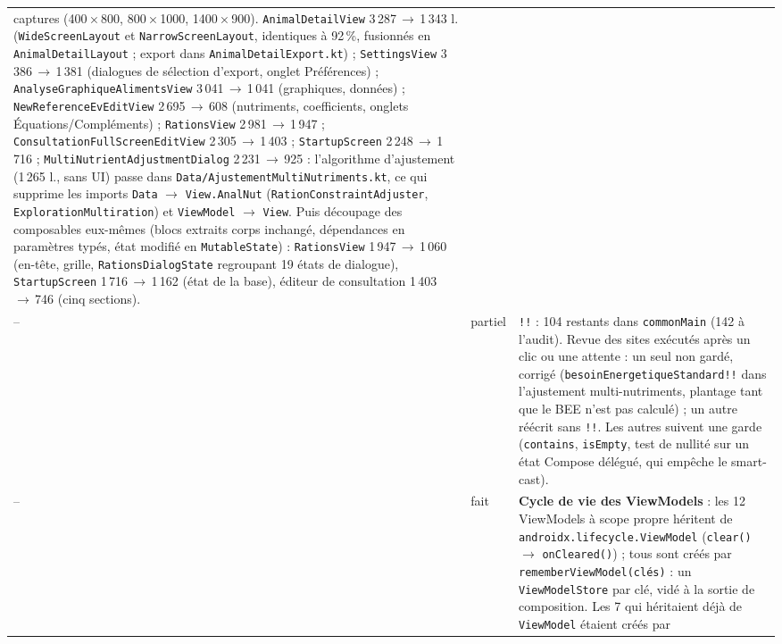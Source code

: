 \documentclass[11pt,a4paper]{article}
\newcommand{\code}[1]{\texttt{#1}}
\begin{document}
\begin{longtable}{p{0.5cm}p{3.2cm}p{11cm}}
           captures (400\,×\,800, 800\,×\,1000, 1400\,×\,900).
           \code{AnimalDetailView} 3\,287\,$\to$\,1\,343 l. (\code{WideScreenLayout} et
           \code{NarrowScreenLayout}, identiques à 92\,\%, fusionnés en \code{AnimalDetailLayout} ;
           export dans \code{AnimalDetailExport.kt}) ;
           \code{SettingsView} 3\,386\,$\to$\,1\,381 (dialogues de sélection d'export, onglet Préférences) ;
           \code{AnalyseGraphiqueAlimentsView} 3\,041\,$\to$\,1\,041 (graphiques, données) ;
           \code{NewReferenceEvEditView} 2\,695\,$\to$\,608 (nutriments, coefficients, onglets
           Équations/Compléments) ; \code{RationsView} 2\,981\,$\to$\,1\,947 ;
           \code{ConsultationFullScreenEditView} 2\,305\,$\to$\,1\,403 ;
           \code{StartupScreen} 2\,248\,$\to$\,1\,716 ;
           \code{MultiNutrientAdjustmentDialog} 2\,231\,$\to$\,925 : l'algorithme d'ajustement
           (1\,265 l., sans UI) passe dans \code{Data/AjustementMultiNutriments.kt}, ce qui supprime
           les imports \code{Data} $\to$ \code{View.AnalNut} (\code{RationConstraintAdjuster},
           \code{ExplorationMultiration}) et \code{ViewModel} $\to$ \code{View}.
           Puis découpage des composables eux-mêmes (blocs extraits corps inchangé, dépendances en
           paramètres typés, état modifié en \code{MutableState}) : \code{RationsView}
           1\,947\,$\to$\,1\,060 (en-tête, grille, \code{RationsDialogState} regroupant 19 états de
           dialogue), \code{StartupScreen} 1\,716\,$\to$\,1\,162 (état de la base),
           éditeur de consultation 1\,403\,$\to$\,746 (cinq sections). \\
-- & partiel & \code{!!} : 104 restants dans \code{commonMain} (142 à l'audit). Revue des sites
           exécutés après un clic ou une attente : un seul non gardé, corrigé
           (\code{besoinEnergetiqueStandard!!} dans l'ajustement multi-nutriments, plantage tant que le BEE
           n'est pas calculé) ; un autre réécrit sans \code{!!}. Les autres suivent une garde
           (\code{contains}, \code{isEmpty}, test de nullité sur un état Compose délégué, qui empêche le
           smart-cast). \\
-- & fait & \textbf{Cycle de vie des ViewModels} : les 12 ViewModels à scope propre héritent de
           \code{androidx.lifecycle.ViewModel} (\code{clear()} $\to$ \code{onCleared()}) ; tous sont
           créés par \code{rememberViewModel(clés)} : un \code{ViewModelStore} par clé, vidé à la sortie
           de composition. Les 7 qui héritaient déjà de \code{ViewModel} étaient créés par

\end{longtable}
\end{document}
